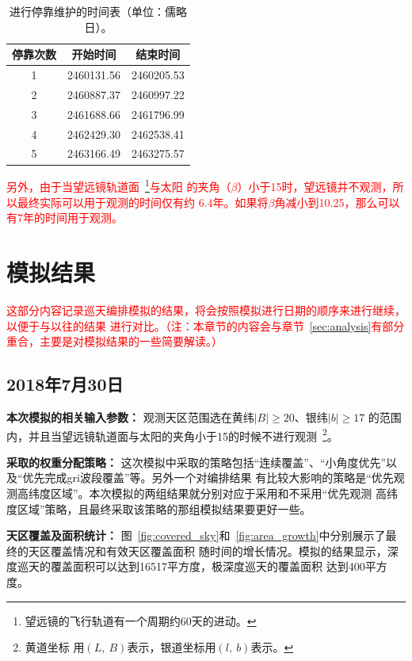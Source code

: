 \documentclass[a4paper,11pt]{ctexart}
\def\blankpage{%
      \clearpage%
      \thispagestyle{empty}%
      \addtocounter{page}{-1}%
      \null%
      \clearpage}
\newcommand{\RT}[1]{\textcolor{red}{#1}}
\begin{document}
\begin{table}[h!]
\renewcommand{\arraystretch}{1}
\centering
\begin{tabular}{c|c|c}
\toprule
停靠次数 & 开始时间 & 结束时间 \\
\hline
1 & 2460131.56 & 2460205.53 \\
\hline
2 & 2460887.37 & 2460997.22 \\
\hline
3 & 2461688.66 & 2461796.99 \\
\hline
4 & 2462429.30 & 2462538.41 \\
\hline
5 & 2463166.49 & 2463275.57 \\
\bottomrule
\end{tabular}
\caption{进行停靠维护的时间表（单位：儒略日）。}
\label{tab:stoptime}
\end{table}

\RT{\heiti 另外，由于当望远镜轨道面~\footnote{望远镜的飞行轨道有一个周期约60天的进动。}与太阳
的夹角（$\beta$）小于15\textdegree 时，望远镜并不观测，所以最终实际可以用于观测的时间仅有约
6.4年。如果将$\beta$角减小到10.25\textdegree，那么可以有7年的时间用于观测。}

\blankpage
\section{模拟结果}

\RT{\heiti 这部分内容记录巡天编排模拟的结果，将会按照模拟进行日期的顺序来进行继续，以便于与以往的结果
进行对比。（注：本章节的内容会与章节~\ref{sec:analysis}有部分重合，主要是对模拟结果的一些简要解读。）}

\subsection{2018年7月30日}
\textbf{本次模拟的相关输入参数：}
观测天区范围选在黄纬$|B|\ge 20$\textdegree 、银纬$|b|\ge 17$\textdegree
的范围内，并且当望远镜轨道面与太阳的夹角小于15\textdegree 的时候不进行观测~\footnote{黄道坐标
用$(L,~B)$表示，银道坐标用$(l,~b)$表示。}。

\textbf{采取的权重分配策略：}
这次模拟中采取的策略包括“连续覆盖”、“小角度优先”以及“优先完成gri波段覆盖”等。另外一个对编排结果
有比较大影响的策略是“优先观测高纬度区域”。本次模拟的两组结果就分别对应于采用和不采用“优先观测
高纬度区域”策略，且最终采取该策略的那组模拟结果要更好一些。

\textbf{天区覆盖及面积统计：}
图~\ref{fig:covered_sky}和~\ref{fig:area_growth}中分别展示了最终的天区覆盖情况和有效天区覆盖面积
随时间的增长情况。模拟的结果显示，深度巡天的覆盖面积可以达到16517平方度，极深度巡天的覆盖面积
达到400平方度。
\end{document}
